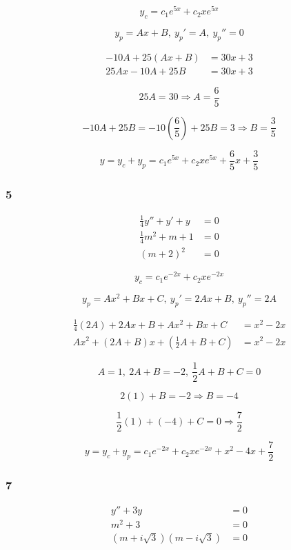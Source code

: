 \documentclass{article}
\begin{document}
\[y_c = c_1 e^{5x} + c_2 x e^{5x}\]

\[y_p = Ax + B, \:y_p' = A, \:y_p'' = 0\]

\begin{align*}
  -10A + 25(Ax + B) & = 30x + 3 \\
  25Ax - 10A + 25B  & = 30x + 3
\end{align*}

\[25A = 30 \Rightarrow A = \frac{6}{5}\]

\[-10A + 25B = -10 \left( \frac{6}{5} \right) + 25B = 3 \Rightarrow B = \frac{3}{5}\]

\[y = y_c + y_p = c_1 e^{5x} + c_2 x e^{5x} + \frac{6}{5} x + \frac{3}{5}\]

\subsubsection{5}

\begin{align*}
  \frac{1}{4} y'' + y' + y & = 0 \\
  \frac{1}{4} m^2 + m + 1  & = 0 \\
  (m + 2)^2                & = 0
\end{align*}

\[y_c = c_1 e^{-2x} + c_2 x e^{-2x}\]

\[y_p = Ax^2 + Bx + C, \:y_p' = 2Ax + B, \:y_p'' = 2A\]

\begin{align*}
  \frac{1}{4} (2A) + 2Ax + B + Ax^2 + Bx + C   & = x^2 - 2x \\
  A x^2 + (2A + B) x + (\frac{1}{2} A + B + C) & = x^2 - 2x
\end{align*}

\[A = 1, \: 2A + B = -2, \: \frac{1}{2} A + B + C = 0\]

\[2(1) + B = -2 \Rightarrow B = -4\]

\[\frac{1}{2} (1) + (-4) + C = 0 \Rightarrow \frac{7}{2}\]

\[y = y_c + y_p = c_1 e^{-2x} + c_2 x e^{-2x} + x^2 - 4x + \frac{7}{2}\]

\subsubsection{7}

\begin{align*}
  y'' + 3y                         & = 0 \\
  m^2 + 3                          & = 0 \\
  (m + i \sqrt{3})(m - i \sqrt{3}) & = 0
\end{align*}
\end{document}
